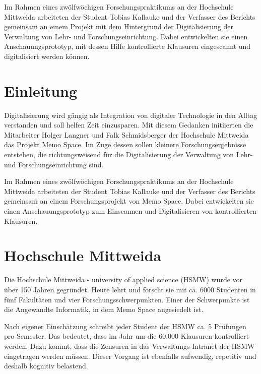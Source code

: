 \documentclass[notables, nomenclature, oneside, 150]{HSMW-Thesis}
\begin{document}
\begin{Referat}
Im Rahmen eines zwölfwöchigen Forschungspraktikums an der Hochschule Mittweida arbeiteten der Student Tobias Kallauke und der Verfasser des Berichts gemeinsam an einem Projekt mit dem Hintergrund der Digitalisierung der Verwaltung von Lehr- und Forschungseinrichtung. Dabei entwickelten sie einen Anschauungsprototyp, mit dessen Hilfe kontrollierte Klausuren eingescannt und digitalisiert werden können.
\end{Referat}

\Hauptteil


\chapter{Einleitung}
	Digitalisierung wird gängig als Integration von digitaler Technologie in den Alltag verstanden und soll helfen Zeit einzusparen. Mit diesem Gedanken initiierten die Mitarbeiter Holger Langner und Falk Schmidsberger der Hochschule Mittweida das Projekt Memo Space. Im Zuge dessen sollen kleinere Forschungsergebnisse entstehen, die richtungsweisend für die Digitalisierung der Verwaltung von Lehr- und Forschungseinrichtung sind.

	Im Rahmen eines zwölfwöchigen Forschungspraktikums an der Hochschule Mittweida arbeiteten der Student Tobias Kallauke und der Verfasser des Berichts gemeinsam an einem Forschungsprojekt von Memo Space. Dabei entwickelten sie einen Anschauungsprototyp zum Einscannen und Digitalisieren von kontrollierten Klausuren.


\chapter{Hochschule Mittweida}
	Die Hochschule Mittweida - university of applied science (HSMW)  wurde vor über 150 Jahren gegründet. Heute lehrt und forscht sie mit ca. 6000 Studenten in fünf Fakultäten und vier Forschungsschwerpunkten\cite{hochschule_mittweida_hochschule_nodate}. Einer der Schwerpunkte ist die Angewandte Informatik, in dem Memo Space angesiedelt ist.
	
	Nach eigener Einschätzung schreibt jeder Student der HSMW ca. 5 Prüfungen pro Semester. Das bedeutet, dass im Jahr um die 60.000 Klausuren kontrolliert werden. Dazu kommt, dass die Zensuren in das Verwaltungs-Intranet der HSMW eingetragen werden müssen. Dieser Vorgang ist ebenfalls aufwendig, repetitiv und deshalb kognitiv belastend.
	
\end{document}
